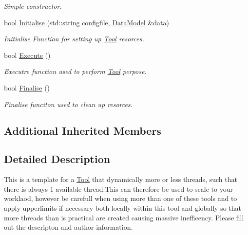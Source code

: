 \begin{DoxyCompactItemize}
\begin{DoxyCompactList}\small\item\em Simple constructor. \end{DoxyCompactList}\item 
bool \hyperlink{classMyToolDynamicMultiThread_ac082408d85bc3e76214e55d4f62de0da}{Initialise} (std\-::string configfile, \hyperlink{classDataModel}{Data\-Model} \&data)
\begin{DoxyCompactList}\small\item\em Initialise Function for setting up \hyperlink{classTool}{Tool} resorces. \end{DoxyCompactList}\item 
\hypertarget{classMyToolDynamicMultiThread_aec2f9af9495520d74bb154d626a94a63}{bool \hyperlink{classMyToolDynamicMultiThread_aec2f9af9495520d74bb154d626a94a63}{Execute} ()}\label{classMyToolDynamicMultiThread_aec2f9af9495520d74bb154d626a94a63}

\begin{DoxyCompactList}\small\item\em Executre function used to perform \hyperlink{classTool}{Tool} perpose. \end{DoxyCompactList}\item 
\hypertarget{classMyToolDynamicMultiThread_ab70e77b0fd90e50c5103ccfa0bfd6485}{bool \hyperlink{classMyToolDynamicMultiThread_ab70e77b0fd90e50c5103ccfa0bfd6485}{Finalise} ()}\label{classMyToolDynamicMultiThread_ab70e77b0fd90e50c5103ccfa0bfd6485}

\begin{DoxyCompactList}\small\item\em Finalise funciton used to clean up resorces. \end{DoxyCompactList}\end{DoxyCompactItemize}
\subsection*{Additional Inherited Members}


\subsection{Detailed Description}
This is a template for a \hyperlink{classTool}{Tool} that dynamically more or less threads, such that there is always 1 available thread.\-This can therefore be used to scale to your worklaod, however be carefull when using more than one of these tools and to apply upperlimits if necessary both locally within this tool and globally so that more threads than is practical are created causing massive inefficency. Please fill out the descripton and author information.

